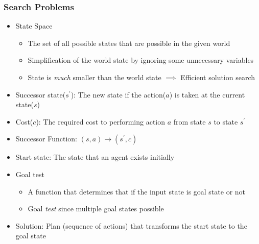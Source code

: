 \subsubsection*{Search Problems}
\begin{itemize}
    \item State Space
    \begin{itemize}
        \item The set of all possible states that are possible in the given world
        \item Simplification of the world state by ignoring some unnecessary variables
        \item State is \textit{much} smaller than the world state $\implies$ Efficient solution search
    \end{itemize}
    \item Successor state($s^\prime$): The new state if the action($a$) is taken at the current state($s$)
    \item Cost($c$): The required cost to performing action $a$ from state $s$ to state $s^\prime$
    \item Successor Function: $(s,a)\to(s^\prime,c)$
    \item Start state: The state that an agent exists initially
    \item Goal test
    \begin{itemize}
        \item A function that determines that if the input state is goal state or not
        \item Goal \textit{test} since multiple goal states possible
    \end{itemize}
    \item Solution: Plan (sequence of actions) that transforms the start state to the goal state
\end{itemize}

